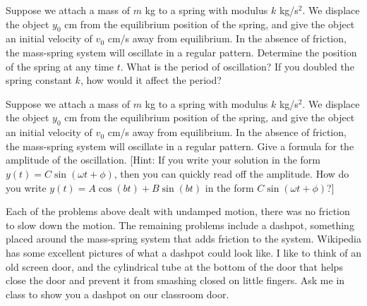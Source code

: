 \begin{problem}
 Suppose we attach a mass of $m$ kg to a spring with modulus $k$ kg/s$^2$. We displace the object $y_0$ cm from the equilibrium position of the spring, and give the object an initial velocity of $v_0$ cm/s away from equilibrium. In the absence of friction, the mass-spring system will oscillate in a regular pattern. Determine the position of the spring at any time $t$.  What is the period of oscillation? If you doubled the spring constant $k$, how would it affect the period?
\end{problem}

\begin{problem}
 Suppose we attach a mass of $m$ kg to a spring with modulus $k$ kg/s$^2$. We displace the object $y_0$ cm from the equilibrium position of the spring, and give the object an initial velocity of $v_0$ cm/s away from equilibrium. In the absence of friction, the mass-spring system will oscillate in a regular pattern. Give a formula for the amplitude of the oscillation. [Hint: If you write your solution in the form $y(t) = C\sin(\omega t+\phi)$, then you can quickly read off the amplitude. How do you write $y(t) = A\cos(bt)+B\sin(bt)$ in the form $C\sin(\omega t+\phi)$?] 
\end{problem}

Each of the problems above dealt with undamped motion, there was no friction to slow down the motion.  The remaining problems include a dashpot, something placed around the mass-spring system that adds friction to the system. Wikipedia has some excellent pictures of what a dashpot could look like.  I like to think of an old screen door, and the cylindrical tube at the bottom of the door that helps close the door and prevent it from smashing closed on little fingers.  Ask me in class to show you a dashpot on our classroom door.

